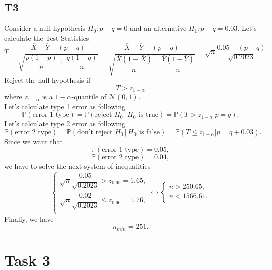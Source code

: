 \documentclass[a4paper, 12pt]{article}
\renewcommand*{\P}{\mathbb{P}}
\begin{document}
\subsection{T3}
Consider a null hypothesis $H_0: p - q = 0$ and an alternative $H_1: p - q = 0.03.$ Let's calculate the Test Statistics
$$
T = \dfrac{\overline{X} - \overline{Y} - (p - q)}{\sqrt{\dfrac{p(1-p)}{n} + \dfrac{q(1-q)}{n}}} = \dfrac{\overline{X} - \overline{Y} - (p - q)}{\sqrt{\dfrac{\overline{X}(1-\overline{X})}{n} + \dfrac{\overline{Y}(1-\overline{Y})}{n}}} = \sqrt{n} \dfrac{0.05 - (p-q)}{\sqrt{0.2023}}.
$$
Reject the null hypothesis if 
$$
T > z_{1-\alpha}
$$ 
where $z_{1-\alpha}$ is a $1-\alpha$-quantile of $\mathcal{N}(0, 1).$ \\
Let's calculate type 1 error as following
$$
\P(\text{error 1 type}) = \P (\text{reject }H_0 \, | \, H_0 \text{ is true}) = \P(T > z_{1-\alpha} | p = q).
$$
Let's calculate type 2 error as following
$$
\P(\text{error 2 type}) = \P (\text{don't reject }H_0 \, | \, H_0 \text{ is false}) = \P(T \leqslant z_{1-\alpha} | p = q + 0.03).
$$
Since we want that
$$
\P(\text{error 1 type}) = 0.05,
$$
$$
\P(\text{error 2 type}) = 0.04,
$$
we have to solve the next system of inequalities
$$
\begin{cases}
\sqrt{n} \dfrac{0.05}{\sqrt{0.2023}} > z_{0.95} = 1.65, \\
\sqrt{n} \dfrac{0.02}{\sqrt{0.2023}} \leqslant z_{0.96} = 1.76, \\
\end{cases}
\Leftrightarrow
\begin{cases}
n > 250.65, \\
n < 1566.61. \\
\end{cases}
$$
Finally, we have 
$$
n_{min} = 251.
$$

\section{Task 3}
\end{document}
